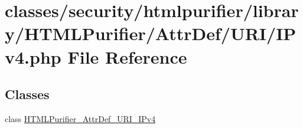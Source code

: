 \hypertarget{IPv4_8php}{\section{classes/security/htmlpurifier/library/\+H\+T\+M\+L\+Purifier/\+Attr\+Def/\+U\+R\+I/\+I\+Pv4.php File Reference}
\label{IPv4_8php}
}
\subsection*{Classes}
\begin{DoxyCompactItemize}
\item 
class \hyperlink{classHTMLPurifier__AttrDef__URI__IPv4}{H\+T\+M\+L\+Purifier\+\_\+\+Attr\+Def\+\_\+\+U\+R\+I\+\_\+\+I\+Pv4}
\end{DoxyCompactItemize}
